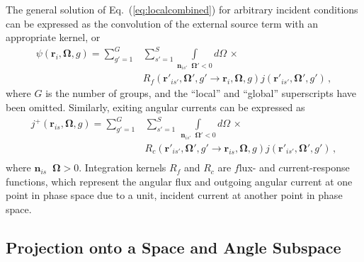 \documentclass[5p,times,twocolumn,10pt]{elsarticle}
\newcommand{\EQ}[1]{Eq.~(\ref{#1})}               %
\DeclareMathOperator*{\dotp}{{\scriptscriptstyle \stackrel{\bullet}{{}}}}
\begin{document}
    The general solution of \EQ{eq:localcombined} for arbitrary incident
    conditions can be expressed as the convolution of the external source
    term with an appropriate kernel, or
    \begin{equation}
        \begin{split}
            \psi(\mathbf{r}_i, \bm{\Omega},g) =
            \sum^{G}_{g'=1} &  \sum^{S}_{s'=1}
            \int\limits_{\mathbf{n}_{is'} \dotp \bm{\Omega}' < 0} d\Omega \,
            \times \\
            & R_{f}(\mathbf{r}'_{is'},\bm{\Omega}',g' \rightarrow
            \mathbf{r}_i,\bm{\Omega},g)
            j (\mathbf{r}'_{is'},\bm{\Omega}', g')  \, ,
        \end{split}
        \label{eq:localflux}
    \end{equation}
    where $G$ is the number of groups, and the ``local'' and ``global''
    superscripts have been omitted. Similarly, exiting angular currents can
    be expressed as
    \begin{equation}
        \begin{split}
            j^+(\mathbf{r}_{is},\bm{\Omega},g) =
            \sum^{G}_{g'=1} &  \sum^{S}_{s'=1}  \,
            \int\limits_{\mathbf{n}_{is'} \dotp \bm{\Omega}' < 0} d\Omega \,
            \times \\
            & R_{c}(\mathbf{r}'_{is'},\bm{\Omega}' ,g' \rightarrow
            \mathbf{r}_{is},\bm{\Omega},g)
            j (\mathbf{r}'_{is'},\bm{\Omega}', g')  \, , \\
        \end{split}
        \label{eq:localj}
    \end{equation}
    where $\mathbf{n}_{is} \dotp \bm{\Omega} > 0$. Integration kernels $R_{f}$
    and $R_{c}$ are $f$lux- and $c$urrent-response functions, which
    represent the angular flux and outgoing angular current at one point in
    phase space due to a unit, incident current at another point in phase space.

    \subsection{Projection onto a Space and Angle Subspace}
\end{document}
